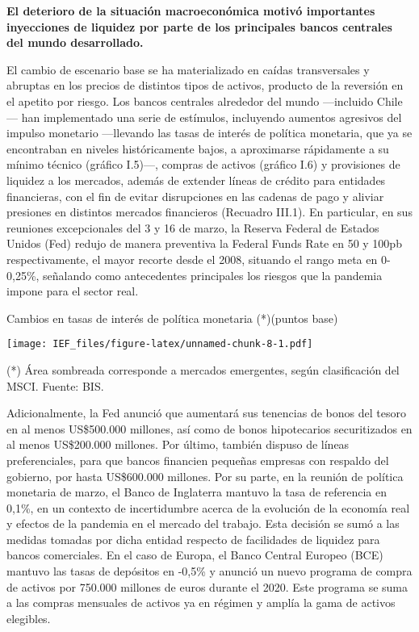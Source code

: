 \documentclass[
]{book}
\begin{document}
\textbf{El deterioro de la situación macroeconómica motivó importantes inyecciones de liquidez por parte de los principales bancos centrales del mundo desarrollado.}

El cambio de escenario base se ha materializado en caídas transversales y
abruptas en los precios de distintos tipos de activos, producto de la reversión
en el apetito por riesgo. Los bancos centrales alrededor del mundo ---incluido
Chile--- han implementado una serie de estímulos, incluyendo aumentos
agresivos del impulso monetario ---llevando las tasas de interés de política
monetaria, que ya se encontraban en niveles históricamente bajos, a
aproximarse rápidamente a su mínimo técnico (gráfico I.5)---, compras de
activos (gráfico I.6) y provisiones de liquidez a los mercados, además de extender
líneas de crédito para entidades financieras, con el fin de evitar disrupciones en las cadenas de pago y aliviar presiones en distintos mercados financieros
(Recuadro III.1). En particular, en sus reuniones excepcionales del 3 y 16 de
marzo, la Reserva Federal de Estados Unidos (Fed) redujo de manera preventiva
la Federal Funds Rate en 50 y 100pb respectivamente, el mayor recorte desde
el 2008, situando el rango meta en 0-0,25\%, señalando como antecedentes
principales los riesgos que la pandemia impone para el sector real.

Cambios en tasas de interés de política monetaria (*)(puntos base)

\texttt{[image: IEF\_files/figure-latex/unnamed-chunk-8-1.pdf]}

(*) Área sombreada corresponde a mercados emergentes, según clasificación del MSCI.
Fuente: BIS.

Adicionalmente, la Fed anunció que aumentará sus tenencias de bonos del
tesoro en al menos US\$500.000 millones, así como de bonos hipotecarios
securitizados en al menos US\$200.000 millones. Por último, también dispuso
de líneas preferenciales, para que bancos financien pequeñas empresas con
respaldo del gobierno, por hasta US\$600.000 millones. Por su parte, en la
reunión de política monetaria de marzo, el Banco de Inglaterra mantuvo la tasa
de referencia en 0,1\%, en un contexto de incertidumbre acerca de la evolución
de la economía real y efectos de la pandemia en el mercado del trabajo.
Esta decisión se sumó a las medidas tomadas por dicha entidad respecto de
facilidades de liquidez para bancos comerciales. En el caso de Europa, el Banco
Central Europeo (BCE) mantuvo las tasas de depósitos en -0,5\% y anunció un
nuevo programa de compra de activos por 750.000 millones de euros durante
el 2020. Este programa se suma a las compras mensuales de activos ya en
régimen y amplía la gama de activos elegibles.
\end{document}
